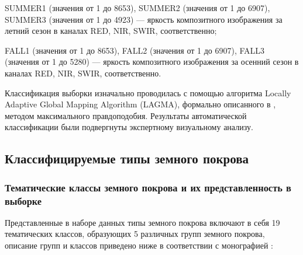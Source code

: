 \documentclass[14pt, a4paper, oneside]{extarticle}
\begin{document}
SUMMER1 (значения от 1 до 8653), SUMMER2 (значения от 1 до 6907), SUMMER3 (значения от 1 до 4923) --- яркость композитного изображения за летний сезон в каналах RED, NIR, SWIR, соответственно;

FALL1 (значения от 1 до 8653), FALL2 (значения от 1 до 6907), FALL3 (значения от 1 до 5280) --- яркость композитного изображения за осенний сезон в каналах RED, NIR, SWIR, соответственно.

Классификация выборки изначально проводилась с помощью алгоритма Locally Adaptive Global Mapping Algorithm (LAGMA), формально описанного в \cite{land-cover-mapping-monograph}, методом максимального правдоподобия. Результаты автоматической классификации были подвергнуты экспертному визуальному анализу.

\subsection{Классифицируемые типы земного покрова}
\subsubsection{Тематические классы земного покрова и их представленность в выборке}
Представленные в наборе данных типы земного покрова включают в себя 19 тематических классов, образующих 5 различных групп земного покрова, описание групп и классов приведено ниже в соответствии с монографией \cite{land-cover-mapping-monograph}:
\end{document}
